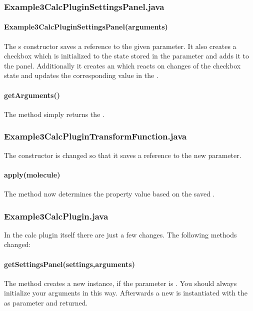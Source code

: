   \subsubsection{Example3CalcPluginSettingsPanel.java}
    \paragraph{Example3CalcPluginSettingsPanel(arguments)}
    The s constructor saves
    a reference to the given  parameter.
    It also creates a checkbox which is initialized to the state stored
    in the  parameter and adds it to the panel.
    Additionally it creates an  which reacts on changes
    of the checkbox state and updates the corresponding
     value in the .

    \paragraph{getArguments()}
    The  method simply returns the .

  \subsubsection{Example3CalcPluginTransformFunction.java}
  The  constructor is changed
  so that it saves a reference to the new  parameter.

    \paragraph{apply(molecule)}
    The  method now determines the property value based on the saved .

  \subsubsection{Example3CalcPlugin.java}
      In the calc plugin itself there are just a few changes. The following methods changed:

      \paragraph{getSettingsPanel(settings,arguments)}
      The  method creates
      a new  instance,
      if the  parameter is .
      You should always initialize your arguments in this way.
      Afterwards a new  is
      instantiated with the  as parameter and returned.

